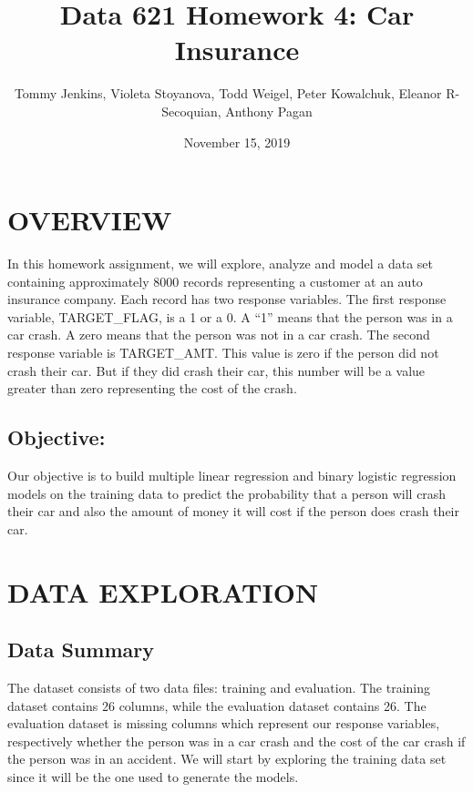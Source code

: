 \documentclass[]{article}
\title{Data 621 Homework 4: Car Insurance}
\author{Tommy Jenkins, Violeta Stoyanova, Todd Weigel, Peter Kowalchuk, Eleanor
R-Secoquian, Anthony Pagan}
\date{November 15, 2019}
\begin{document}
\maketitle

\hypertarget{overview}{%
\section{OVERVIEW}\label{overview}}

In this homework assignment, we will explore, analyze and model a data
set containing approximately 8000 records representing a customer at an
auto insurance company. Each record has two response variables. The
first response variable, TARGET\_FLAG, is a 1 or a 0. A ``1'' means that
the person was in a car crash. A zero means that the person was not in a
car crash. The second response variable is TARGET\_AMT. This value is
zero if the person did not crash their car. But if they did crash their
car, this number will be a value greater than zero representing the cost
of the crash.

\hypertarget{objective}{%
\subsection{Objective:}\label{objective}}

Our objective is to build multiple linear regression and binary logistic
regression models on the training data to predict the probability that a
person will crash their car and also the amount of money it will cost if
the person does crash their car.

\hypertarget{data-exploration}{%
\section{DATA EXPLORATION}\label{data-exploration}}

\hypertarget{data-summary}{%
\subsection{Data Summary}\label{data-summary}}

The dataset consists of two data files: training and evaluation. The
training dataset contains 26 columns, while the evaluation dataset
contains 26. The evaluation dataset is missing columns which represent
our response variables, respectively whether the person was in a car
crash and the cost of the car crash if the person was in an accident. We
will start by exploring the training data set since it will be the one
used to generate the models.
\end{document}
